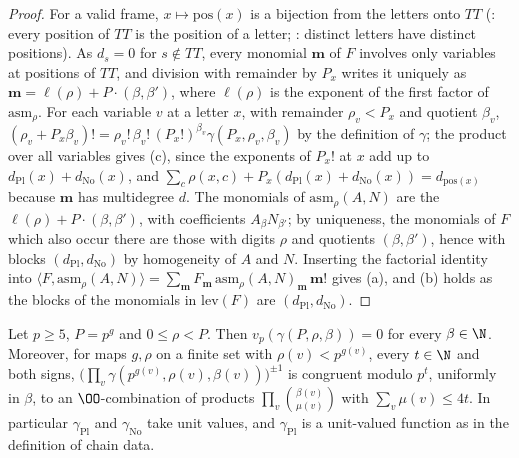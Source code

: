 \begin{proof}
For a valid frame, $x\mapsto\mathrm{pos}(x)$ is a bijection from the letters onto $TT$
(: every position of $TT$ is the position of a letter;
: distinct letters have distinct positions).
As $d_s=0$ for $s\notin TT$, every monomial $\mathbf m$ of $F$ involves only variables at positions of $TT$, and division with
remainder by $P_x$ writes it uniquely as $\mathbf m=\ell(\rho)+P\cdot(\beta,\beta')$, where $\ell(\rho)$ is the exponent of the first factor
of $\mathrm{asm}_\rho$. For each variable $v$ at a letter $x$, with remainder $\rho_v<P_x$ and quotient $\beta_v$,
$(\rho_v+P_x\beta_v)!=\rho_v!\,\beta_v!\,(P_x!)^{\beta_v}\gamma(P_x,\rho_v,\beta_v)$ by the definition of $\gamma$; the product over all variables
gives (c), since the exponents of $P_x!$ at $x$ add up to $d_{\mathrm{Pl}}(x)+d_{\mathrm{No}}(x)$, and $\sum_c\rho(x,c)+P_x(d_{\mathrm{Pl}}(x)+
d_{\mathrm{No}}(x))=d_{\mathrm{pos}(x)}$ because $\mathbf m$ has multidegree $d$. The monomials of $\mathrm{asm}_\rho(A,N)$ are the
$\ell(\rho)+P\cdot(\beta,\beta')$, with coefficients $A_\beta N_{\beta'}$; by uniqueness, the monomials of $F$ which also occur there are
those with digits $\rho$ and quotients $(\beta,\beta')$, hence with blocks $(d_{\mathrm{Pl}},d_{\mathrm{No}})$ by homogeneity of $A$ and $N$.
Inserting the factorial identity into $\langle F,\mathrm{asm}_\rho(A,N)\rangle=\sum_{\mathbf m}F_{\mathbf m}\,\mathrm{asm}_\rho(A,N)_{\mathbf m}\,\mathbf m!$
gives (a), and (b) holds as the blocks of the monomials in $\mathrm{lev}(F)$ are $(d_{\mathrm{Pl}},d_{\mathrm{No}})$.
\end{proof}

\begin{lemma}\label{pf:linkG:gammaunit}
Let $p\ge5$, $P=p^g$ and $0\le\rho<P$. Then $v_p(\gamma(P,\rho,\beta))=0$ for every $\beta\in\N$. Moreover, for maps $g,\rho$ on a finite
set with $\rho(v)<p^{g(v)}$, every $t\in\N$ and both signs, $\bigl(\prod_v\gamma(p^{g(v)},\rho(v),\beta(v))\bigr)^{\pm1}$ is congruent
modulo $p^t$, uniformly in $\beta$, to an $\OO$-combination of products $\prod_v\binom{\beta(v)}{\mu(v)}$ with $\sum_v\mu(v)\le4t$. In
particular $\gamma_{\mathrm{Pl}}$ and $\gamma_{\mathrm{No}}$ take unit values, and $\gamma_{\mathrm{Pl}}$ is a unit-valued function as in the
definition of chain data.
\end{lemma}

